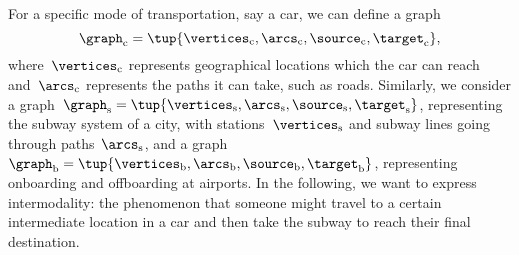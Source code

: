 

\section{}


For a specific mode of transportation, say a car, we can define a graph
\begin{equation*}
 \graph_\mathrm{c}=\tup{\vertices_\mathrm{c},\arcs_\mathrm{c},\source_\mathrm{c},\target_\mathrm{c}},
\end{equation*}
where~$\vertices_\mathrm{c}$ represents geographical locations which the car can reach and~$\arcs_\mathrm{c}$ represents the paths it can take, such as roads. Similarly, we consider a graph~$\graph_\mathrm{s}=\tup{\vertices_\mathrm{s},\arcs_\mathrm{s},\source_\mathrm{s},\target_\mathrm{s}}$, representing the subway system of a city, with stations~$\vertices_\mathrm{s}$ and subway lines going through paths~$\arcs_\mathrm{s}$, and a graph $\graph_\mathrm{b}=\tup{\vertices_\mathrm{b},\arcs_\mathrm{b},\source_\mathrm{b},\target_\mathrm{b}}$, representing onboarding and offboarding at airports. In the following, we want to express intermodality: the phenomenon that someone might travel to a certain intermediate location in a car and then take the subway to reach their final destination.

